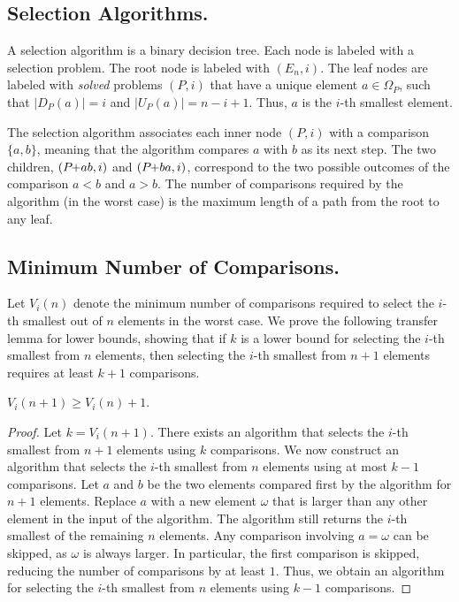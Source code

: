 \documentclass[a4paper,UKenglish,cleveref, autoref, thm-restate]{lipics-v2021}
\newcommand{\pchild}[3]{{#1}\kern-1pt{+}{#2}{#3}}
\newcommand{\less}[2]{D_{#1}(#2)}
\newcommand{\greater}[2]{U_{#1}(#2)}
\begin{document}
\subsection{Selection Algorithms.}
A selection algorithm is a binary decision tree.
Each node is labeled with a selection problem.
The root node is labeled with $(E_n, i)$.
The leaf nodes are labeled with \emph{solved} problems $(P, i)$ that have a unique element $a \in \Omega_P$, such that $|\less{P}{a}| = i$ and $|\greater{P}{a}| = n - i + 1$.
Thus, $a$ is the $i$-th smallest element.

The selection algorithm associates each inner node $(P, i)$ with a comparison $\{a, b\}$, meaning that the algorithm compares $a$ with $b$ as its next step.
The two children, $(\pchild{P}{a}{b}, i)$ and $(\pchild{P}{b}{a}, i)$, correspond to the two possible outcomes of the comparison $a < b$ and $a > b$.
The number of comparisons required by the algorithm (in the worst case) is the maximum length of a path from the root to any leaf.


\subsection{Minimum Number of Comparisons.}

Let $V_i(n)$ denote the minimum number of comparisons required to select the $i$-th smallest out of $n$ elements in the worst case.
We prove the following transfer lemma for lower bounds, showing that if $k$ is a lower bound for selecting the $i$-th smallest from $n$ elements, then selecting the $i$-th smallest from $n + 1$ elements requires at least $k + 1$ comparisons.

\begin{lemma} \label{lemma:previous_next_poset}
  $V_i(n + 1) \geq V_i(n) + 1$.
\end{lemma}

\begin{proof}
  Let $k = V_i(n + 1)$.
  There exists an algorithm that selects the $i$-th smallest from $n + 1$ elements using $k$ comparisons.
  We now construct an algorithm that selects the $i$-th smallest from $n$ elements using at most $k - 1$ comparisons.
  Let $a$ and $b$ be the two elements compared first by the algorithm for $n + 1$ elements.
  Replace $a$ with a new element $\omega$ that is larger than any other element in the input of the algorithm.
  The algorithm still returns the $i$-th smallest of the remaining $n$ elements.
  Any comparison involving $a = \omega$ can be skipped, as $\omega$ is always larger.
  In particular, the first comparison is skipped, reducing the number of comparisons by at least $1$.
  Thus, we obtain an algorithm for selecting the $i$-th smallest from $n$ elements using $k - 1$ comparisons.
\end{proof}
\end{document}
